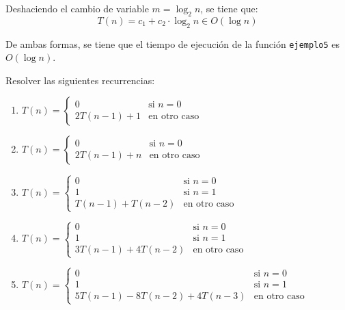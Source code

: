 \begin{ejercicio}
\begin{enumerate}
\begin{description}
            Deshaciendo el cambio de variable $m=\log_2 n$, se tiene que:
            \begin{equation*}
                T(n) = c_1 + c_2\cdot \log_2 n \in O(\log n)
            \end{equation*}
        \end{description}

        De ambas formas, se tiene que el tiempo de ejecución de la función \verb|ejemplo5| es $O(\log n)$.
    \end{enumerate}
\end{ejercicio}


\begin{ejercicio}
    Resolver las siguientes recurrencias:
    \begin{enumerate}[label=\alph*)]
        \item $T(n) = \begin{cases}
            0 & \text{si } n = 0 \\
            2T(n-1) + 1 & \text{en otro caso}
        \end{cases}$

        \item $T(n) = \begin{cases}
            0 & \text{si } n = 0 \\
            2T(n-1) + n & \text{en otro caso}
        \end{cases}$

        \item $T(n) = \begin{cases}
            0 & \text{si } n = 0 \\
            1 & \text{si } n = 1 \\
            T(n-1) + T(n-2) & \text{en otro caso}
        \end{cases}$

        \item $T(n) = \begin{cases}
            0 & \text{si } n = 0 \\
            1 & \text{si } n = 1 \\
            3T(n-1) + 4T(n-2) & \text{en otro caso}
        \end{cases}$

        \item $T(n) = \begin{cases}
            0 & \text{si } n = 0 \\
            1 & \text{si } n = 1 \\
            5T(n-1) - 8T(n-2) +4T(n-3)& \text{en otro caso}
        \end{cases}$


\end{enumerate}
\end{ejercicio}
